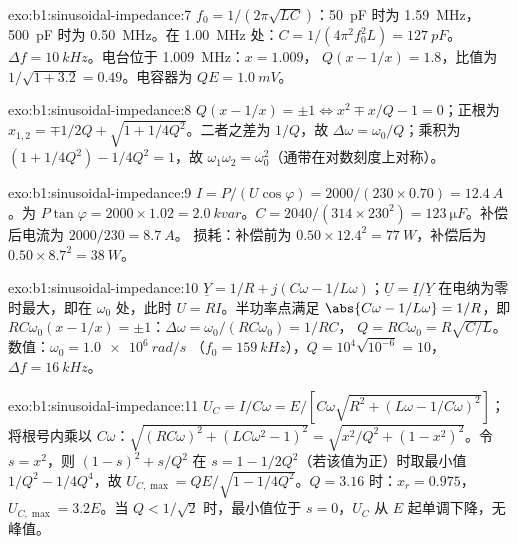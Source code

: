\begin{solution}{exo:b1:sinusoidal-impedance:7}
$f_0 = 1/(2\pi\sqrt{LC})$：\qty{50}{pF} 时为 \qty{1.59}{MHz}，\qty{500}{pF} 时为
\qty{0.50}{MHz}。在 \qty{1.00}{MHz} 处：$C = 1/(4\pi^2f_0^2L) = \qty{127}{pF}$。
$\Delta f = \qty{10}{kHz}$。电台位于 \qty{1.009}{MHz}：$x = 1.009$，
$Q(x - 1/x) = 1.8$，比值为 $1/\sqrt{1 + 3.2} = 0.49$。电容器为
$QE = \qty{1.0}{mV}$。
\end{solution}

\begin{solution}{exo:b1:sinusoidal-impedance:8}
$Q(x - 1/x) = \pm1 \Leftrightarrow x^2 \mp x/Q - 1 = 0$；正根为
$x_{1,2} = \mp 1/2Q + \sqrt{1 + 1/4Q^2}$。二者之差为 $1/Q$，故
$\Delta\omega = \omega_0/Q$；乘积为 $(1 + 1/4Q^2) - 1/4Q^2 = 1$，故
$\omega_1\omega_2 = \omega_0^2$（通带在对数刻度上对称）。
\end{solution}

\begin{solution}{exo:b1:sinusoidal-impedance:9}
$I = P/(U\cos\varphi) = 2000/(230 \times 0.70) = \qty{12.4}{A}$。为 $P\tan\varphi = 2000 \times 1.02 = \qty{2.0}{kvar}$。$C = 2040/(314
\times 230^2) = \qty{123}{\micro F}$。补偿后电流为 $2000/230 = \qty{8.7}{A}$。
损耗：补偿前为 $0.50 \times 12.4^2 = \qty{77}{W}$，补偿后为 $0.50 \times 8.7^2 =
\qty{38}{W}$。
\end{solution}

\begin{solution}{exo:b1:sinusoidal-impedance:10}
$\underline Y = 1/R + j(C\omega - 1/L\omega)$；$\underline U = \underline I/
\underline Y$ 在电纳为零时最大，即在 $\omega_0$ 处，此时 $U = RI$。半功率点满足
$\abs{C\omega - 1/L\omega} = 1/R$，即
$RC\omega_0(x - 1/x) = \pm1$：$\Delta\omega = \omega_0/(RC\omega_0) = 1/RC$，
$Q = RC\omega_0 = R\sqrt{C/L}$。数值：$\omega_0 = \qty{1.0e6}{rad/s}$
（$f_0 = \qty{159}{kHz}$），$Q = 10^4\sqrt{10^{-6}} = 10$，$\Delta f =
\qty{16}{kHz}$。
\end{solution}

\begin{solution}{exo:b1:sinusoidal-impedance:11}
$U_C = I/C\omega = E/[C\omega\sqrt{R^2 + (L\omega - 1/C\omega)^2}]$；
将根号内乘以 $C\omega$：$\sqrt{(RC\omega)^2 + (LC\omega^2 - 1)^2} =
\sqrt{x^2/Q^2 + (1 - x^2)^2}$。令 $s = x^2$，则 $(1 - s)^2 + s/Q^2$ 在
$s = 1 - 1/2Q^2$（若该值为正）时取最小值 $1/Q^2 - 1/4Q^4$，故
$U_{C,\max} = QE/\sqrt{1 - 1/4Q^2}$。$Q = 3.16$ 时：$x_r = 0.975$，
$U_{C,\max} = 3.2E$。当 $Q < 1/\sqrt2$ 时，最小值位于 $s = 0$，$U_C$
从 $E$ 起单调下降，无峰值。
\end{solution}

